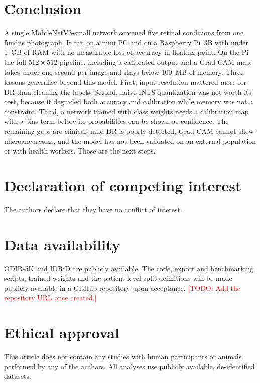 \documentclass[a4paper,fleqn]{cas-sc}
\newcommand{\todo}[1]{\textcolor{red}{[TODO: #1]}}
\begin{document}
\section{Conclusion}
\label{sec:conclusion}
A single MobileNetV3-small network screened five retinal conditions from
one fundus photograph. It ran on a mini PC and on a Raspberry Pi~3B with
under 1~GB of RAM with no measurable loss of accuracy in floating point.
On the Pi the full $512\times512$ pipeline, including a calibrated output
and a Grad-CAM map, takes under one second per image and stays below
100~MB of memory. Three lessons generalise beyond this model. First,
input resolution mattered more for DR than cleaning the labels. Second,
naive INT8 quantization was not worth its cost, because it degraded both
accuracy and calibration while memory was not a constraint. Third, a
network trained with class weights needs a calibration map with a bias
term before its probabilities can be shown as confidence. The remaining
gaps are clinical: mild DR is poorly detected, Grad-CAM cannot show
microaneurysms, and the model has not been validated on an external
population or with health workers. Those are the next steps.

\printcredits

\section*{Declaration of competing interest}
The authors declare that they have no conflict of interest.

\section*{Data availability}
ODIR-5K \cite{li2021benchmark,odir2019challenge} and IDRiD \cite{porwal2018indian} are publicly available.
The code, export and benchmarking scripts, trained weights and the
patient-level split definitions will be made publicly available in a
GitHub repository upon acceptance. \todo{Add the repository URL once created.}

\section*{Ethical approval}
This article does not contain any studies with human participants or
animals performed by any of the authors. All analyses use publicly
available, de-identified datasets.
\end{document}
